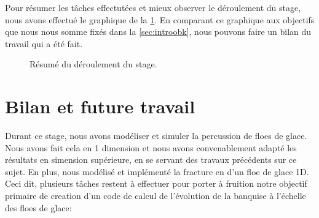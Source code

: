 \vspace*{0.50cm}
Pour résumer les tâches effectutées et mieux observer le déroulement du stage, nous avons effectué le graphique de la \cref{fig:timeline}. En comparant ce graphique aux objectifs que nous nous somme fixés dans la \cref{sec:introobk}, nous pouvons faire un bilan du travail qui a été fait.

\begin{figure}[!h]
    \centering
    \caption{Résumé du déroulement du stage.}
    \label{fig:timeline}
\end{figure}








\section{Bilan et future travail}

Durant ce stage, nous avons modéliser et simuler la percussion de floes de glace. Nous avons fait cela en 1 dimension et nous avons convenablement adapté les résultats en simension supérieure, en se servant des travaux précédents sur ce sujet. En plus, nous modélisé et implémenté la fracture en d'un floe de glace 1D. Ceci dit, plusieurs tâches restent à effectuer pour porter à fruition notre objectif primaire de creation d'un code de calcul de l’évolution de la banquise à l’échelle des floes de glace:

